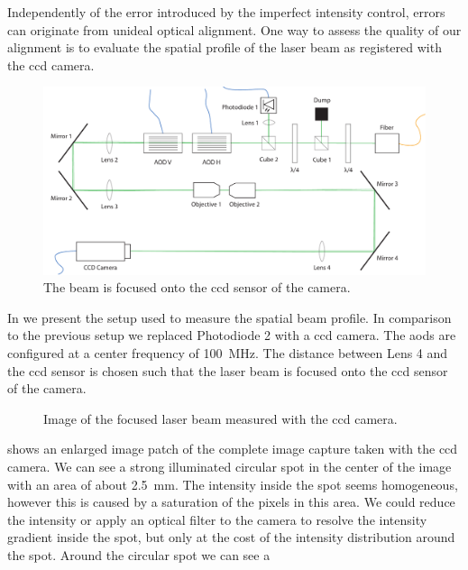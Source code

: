 Independently of the error introduced by the imperfect intensity control,
errors can originate from unideal optical alignment. One way to assess the
quality of our alignment is to evaluate the spatial profile of the laser beam
as registered with the \gls{ccd} camera.
\begin{figure}[h]
  \centering
  \includegraphics[width=\textwidth]{../media/setup/intensity-profile.pdf}
  \caption{The beam is focused onto the \gls{ccd} sensor of the camera.
  }\label{fig:intensity_profile_setup}
\end{figure}
In  we present the setup used to measure
the spatial beam profile. In comparison to the previous setup we replaced
Photodiode 2 with a \gls{ccd} camera. The \gls{aod}s are configured at a
center frequency of \SI{100}{\mega\hertz}. The distance between Lens 4 and
the \gls{ccd} sensor is chosen such that the laser beam is focused onto the
\gls{ccd} sensor of the camera.
\begin{figure}[htb]
  \centering
  \begin{adjustbox}{width=\textwidth}
  \end{adjustbox}
  \caption{Image of the focused laser beam measured with the \gls{ccd} camera.
  }\label{fig:intensity_spatial_image}
\end{figure}
 shows an enlarged image patch of the
complete image capture taken with the \gls{ccd} camera. We can see a strong
illuminated circular spot in the center of the image with an area of about
\SI{2.5}{\milli\meter}. The intensity inside the spot seems homogeneous,
however this is caused by a saturation of the pixels in this area. We could
reduce the intensity or apply an optical filter to the camera to resolve the
intensity gradient inside the spot, but only at the cost of the intensity
distribution around the spot. Around the circular spot we can see a
